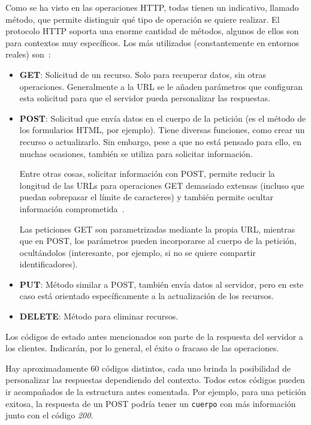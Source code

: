 Como se ha visto en las operaciones HTTP, todas tienen un indicativo, llamado
método, que permite distinguir qué tipo de operación se quiere realizar. El
protocolo HTTP soporta una enorme cantidad de métodos, algunos de ellos son para
contextos muy específicos. Los más utilizados (constantemente en entornos
reales) son~\cite{enwiki:1151700575}:
\begin{itemize}
	\item \textbf{GET}: Solicitud de un recurso. Solo para recuperar datos, sin
  otras operaciones. Generalmente a la URL se le añaden parámetros que
  configuran esta solicitud para que el servidor pueda personalizar las
  respuestas.
  \item \textbf{POST}: Solicitud que envía datos en el cuerpo de la petición (es
  el método de los formularios HTML, por ejemplo). Tiene diversas funciones,
  como crear un recurso o actualizarlo. Sin embargo, pese a que no está pensado
  para ello, en muchas ocasiones, también se utiliza para solicitar información.
  
  Entre otras cosas, solicitar información con POST, permite reducir la longitud
  de las URLs para operaciones GET demasiado extensas (incluso que puedan
  sobrepasar el límite de caracteres) y también permite ocultar información
  comprometida~\cite{http:postnotget}. 
  
  Las peticiones GET son parametrizadas mediante la propia URL, mientras que en
  POST, los parámetros pueden incorporarse al cuerpo de la petición,
  ocultándolos (interesante, por ejemplo, si no se quiere compartir
  identificadores).
  \item \textbf{PUT}: Método similar a POST, también envía datos al servidor,
  pero en este caso está orientado específicamente a la actualización de los
  recursos.
  \item \textbf{DELETE}: Método para eliminar recursos.
\end{itemize}

Los códigos de estado antes mencionados son parte de la respuesta del servidor a
los clientes. Indicarán, por lo general, el éxito o fracaso de las operaciones.

Hay aproximadamente 60 códigos distintos, cada uno brinda la posibilidad de
personalizar las respuestas dependiendo del contexto. Todos estos códigos pueden
ir acompañados de la estructura antes comentada. Por ejemplo, para una petición
exitosa, la respuesta de un POST podría tener un \texttt{cuerpo} con más
información junto con el código \textit{200}. 

